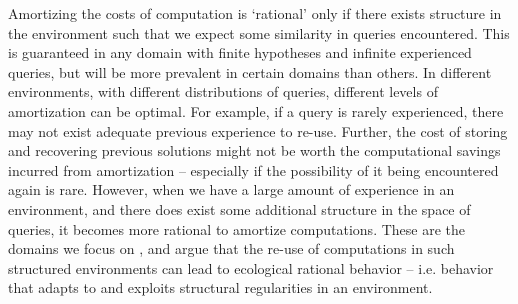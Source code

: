 Amortizing the costs of computation is `rational' only if there exists structure in the environment  such that we expect some similarity in queries encountered. This is guaranteed in any domain with finite hypotheses and infinite experienced queries, but will be more prevalent in certain domains than others. In different environments, with different distributions of queries, different levels of amortization can be optimal. For example, if a query is rarely experienced, there may not exist adequate previous experience to re-use. Further, the cost of storing and recovering previous solutions might not be worth the computational savings incurred from amortization -- especially if the possibility of it being encountered again is rare. However, when we have a large amount of experience in an environment, and there does exist some additional structure in the space of queries, it becomes more rational to amortize computations. These are the domains we focus on
, and argue that the re-use of computations in such structured environments can lead to ecological rational behavior -- i.e. behavior that adapts to and exploits structural regularities in an environment. 

